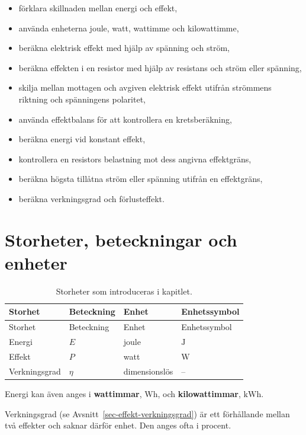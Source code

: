 \documentclass[
  swedish,
  11pt,
  a4paper,
  DIV=11,
  numbers=noendperiod,
  twoside,
  open=any]{scrreprt}
\providecommand{\tightlist}{%
  \setlength{\itemsep}{0pt}\setlength{\parskip}{0pt}}
\begin{document}
\begin{itemize}
\tightlist
\item
  förklara skillnaden mellan energi och effekt,
\item
  använda enheterna joule, watt, wattimme och kilowattimme,
\item
  beräkna elektrisk effekt med hjälp av spänning och ström,
\item
  beräkna effekten i en resistor med hjälp av resistans och ström eller
  spänning,
\item
  skilja mellan mottagen och avgiven elektrisk effekt utifrån strömmens
  riktning och spänningens polaritet,
\item
  använda effektbalans för att kontrollera en kretsberäkning,
\item
  beräkna energi vid konstant effekt,
\item
  kontrollera en resistors belastning mot dess angivna effektgräns,
\item
  beräkna högsta tillåtna ström eller spänning utifrån en effektgräns,
\item
  beräkna verkningsgrad och förlusteffekt.
\end{itemize}

\section{Storheter, beteckningar och
enheter}\label{sec-effekt-storheter}

\begin{longtable}[]{@{}llll@{}}
\caption{Storheter som introduceras i
kapitlet.}\label{tbl-effekt-storheter}\tabularnewline
\toprule\noalign{}
Storhet & Beteckning & Enhet & Enhetssymbol \\
\midrule\noalign{}
\endfirsthead
\toprule\noalign{}
Storhet & Beteckning & Enhet & Enhetssymbol \\
\midrule\noalign{}
\endhead
\bottomrule\noalign{}
\endlastfoot
Energi & \(E\) & joule & \(\mathrm{J}\) \\
Effekt & \(P\) & watt & \(\mathrm{W}\) \\
Verkningsgrad & \(\eta\) & dimensionslös & -- \\
\end{longtable}

Energi kan även anges i \textbf{wattimmar}, \(\mathrm{Wh}\), och
\textbf{kilowattimmar}, \(\mathrm{kWh}\).

Verkningsgrad (se Avsnitt~\ref{sec-effekt-verkningsgrad}) är ett
förhållande mellan två effekter och saknar därför enhet. Den anges ofta
i procent.
\end{document}
